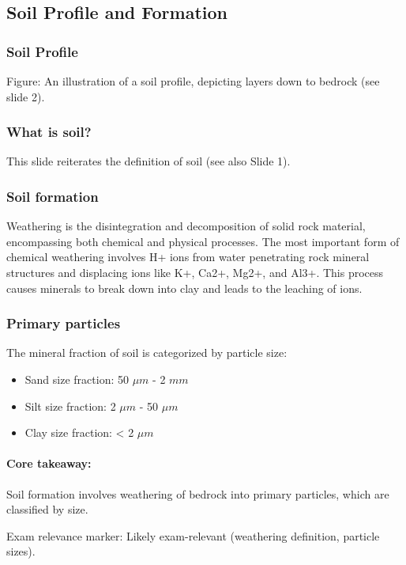 \subsection{Soil Profile and Formation} 
\subsubsection*{Soil Profile} Figure: An illustration of a soil profile, depicting layers down to bedrock (see slide 2).

\subsubsection*{What is soil?} 
This slide reiterates the definition of soil (see also Slide 1).

\subsubsection*{Soil formation} 
Weathering is the disintegration and decomposition of solid rock material, encompassing both chemical and physical processes. The most important form of chemical weathering involves H+ ions from water penetrating rock mineral structures and displacing ions like K+, Ca2+, Mg2+, and Al3+. This process causes minerals to break down into clay and leads to the leaching of ions.

\subsubsection*{Primary particles} 
The mineral fraction of soil is categorized by particle size: 

\begin{itemize} 
    \item Sand size fraction: 50 $\mu m$ - 2 $mm$ 
    \item Silt size fraction: 2 $\mu m$ - 50 $\mu m$ 
    \item Clay size fraction: < 2 $\mu m$
\end{itemize}

\paragraph*{Core takeaway:} 
Soil formation involves weathering of bedrock into primary particles, which are classified by size. 

Exam relevance marker: Likely exam-relevant (weathering definition, particle sizes).

